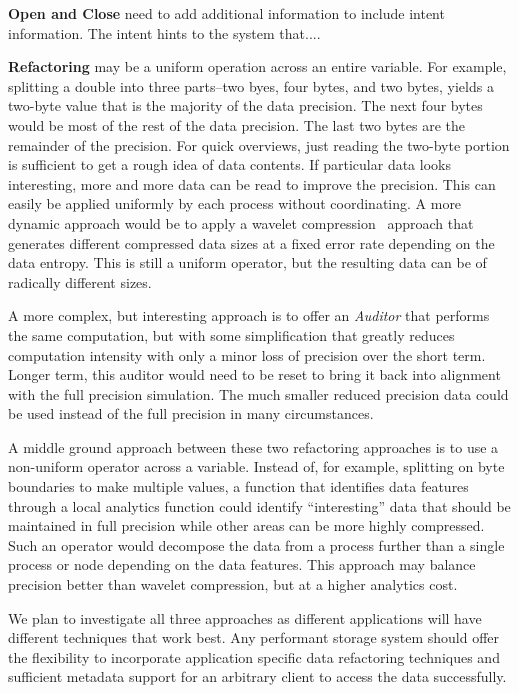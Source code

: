 \documentclass[letterpaper,twocolumn,10pt]{article}
\begin{document}
\noindent\textbf{Open and Close} need to add additional information to include
intent information. The intent hints to the system that....

\noindent\textbf{Refactoring} may be a uniform operation across an
entire variable. For example, splitting a double into three parts--two byes,
four bytes, and two bytes, yields a two-byte value that is the majority of the
data precision. The next four bytes would be most of the rest of the data
precision. The last two bytes are the remainder of the precision. For quick
overviews, just reading the two-byte portion is sufficient to get a rough idea
of data contents. If particular data looks interesting, more and more data can
be read to improve the precision. This can easily be applied uniformly by each
process without coordinating. A more dynamic approach would be to apply a
wavelet compression~\cite{klappenecker:1995:wavelet} approach that generates different compressed
data sizes at a fixed error rate depending on the data entropy. This is still a
uniform operator, but the resulting data can be of radically different sizes.

A more complex, but interesting approach is to offer an {\em Auditor} that
performs the same computation, but with some simplification that greatly
reduces computation intensity with only a minor loss of precision over the
short term. Longer term, this auditor would need to be reset to bring it back
into alignment with the full precision simulation. The much smaller reduced
precision data could be used instead of the full precision in many
circumstances.

A middle ground approach between these two refactoring approaches is to use a
non-uniform operator across a variable. Instead of, for example, splitting on
byte boundaries to make multiple values, a function that identifies data
features through a local analytics function could identify ``interesting'' data
that should be maintained in full precision while other areas can be more
highly compressed. Such an operator would decompose the data from a process
further than a single process or node depending on the data features. This
approach may balance precision better than wavelet compression, but at a higher
analytics cost.

We plan to investigate all three approaches as different applications will have
different techniques that work best. Any performant storage system should
offer the flexibility to incorporate application specific data refactoring
techniques and sufficient metadata support for an arbitrary client to access
the data successfully.
\end{document}

